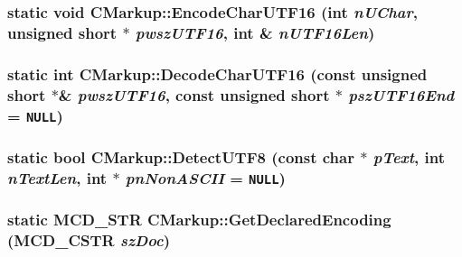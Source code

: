 \subsubsection[EncodeCharUTF16]{\setlength{\rightskip}{0pt plus 5cm}static void CMarkup::EncodeCharUTF16 (int {\em nUChar}, \/  unsigned short $\ast$ {\em pwszUTF16}, \/  int \& {\em nUTF16Len})\hspace{0.3cm}{\tt  [static]}}\label{classCMarkup_08ef725aa1de4831643e478da1aa582e}


\subsubsection[DecodeCharUTF16]{\setlength{\rightskip}{0pt plus 5cm}static int CMarkup::DecodeCharUTF16 (const unsigned short $\ast$\& {\em pwszUTF16}, \/  const unsigned short $\ast$ {\em pszUTF16End} = {\tt NULL})\hspace{0.3cm}{\tt  [static]}}\label{classCMarkup_7eb3cf4b83927047fd4d9ee61ce3f246}


\subsubsection[DetectUTF8]{\setlength{\rightskip}{0pt plus 5cm}static bool CMarkup::DetectUTF8 (const char $\ast$ {\em pText}, \/  int {\em nTextLen}, \/  int $\ast$ {\em pnNonASCII} = {\tt NULL})\hspace{0.3cm}{\tt  [static]}}\label{classCMarkup_f91e20dfe9e95194e3ca8143eeb889c2}


\subsubsection[GetDeclaredEncoding]{\setlength{\rightskip}{0pt plus 5cm}static MCD\_\-STR CMarkup::GetDeclaredEncoding ({\bf MCD\_\-CSTR} {\em szDoc})\hspace{0.3cm}{\tt  [static]}}\label{classCMarkup_1f2b3c176609588986004058a77afe27}


